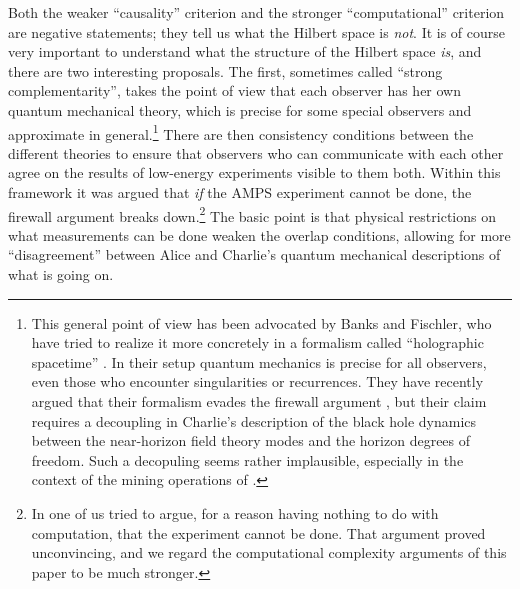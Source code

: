 \documentclass[12pt]{article}
\begin{document}
Both the weaker ``causality'' criterion and the stronger ``computational'' criterion are negative statements; they tell us what the Hilbert space is \textit{not}.  It is of course very important to understand what the structure of the Hilbert space \textit{is}, and there are two interesting proposals.  The first, sometimes called ``strong complementarity'', takes the point of view that each observer has her own quantum mechanical theory, which is precise for some special observers and approximate in general.\footnote{This general point of view has been advocated by Banks and Fischler, who have tried to realize it more concretely in a formalism called ``holographic spacetime'' \cite{Banks:2001px,Banks:2011av}.  In their setup quantum mechanics is precise for all observers, even those who encounter singularities or recurrences.  They have recently argued that their formalism evades the firewall argument \cite{Banks:2012nn}, but their claim requires a decoupling in Charlie's description of the black hole dynamics between the near-horizon field theory modes and the horizon degrees of freedom. Such a decopuling seems rather implausible, especially in the context of the mining operations of \cite{Brown:2012un,Almheiri:2012rt}.}  There are then consistency conditions between the different theories to ensure that observers who can communicate with each other agree on the results of low-energy experiments visible to them both.  Within this framework it was argued \cite{bousso,harlow} that \textit{if} the AMPS experiment cannot be done, the firewall argument breaks down.\footnote{In \cite{harlow} one of us tried to argue, for a reason having nothing to do with computation, that the experiment cannot be done.  That argument proved unconvincing, and we regard the computational complexity arguments of this paper to be much stronger.}  The basic point is that physical restrictions on what measurements can be done weaken the overlap conditions, allowing for more ``disagreement'' between Alice and Charlie's quantum mechanical descriptions of what is going on.  
\end{document}
